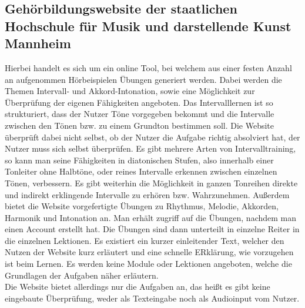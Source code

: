 \subsection*{Gehörbildungswebsite der staatlichen Hochschule für Musik und darstellende Kunst Mannheim}
\label{sec:Mannheim}
Hierbei handelt es sich um ein online Tool, bei welchem aus einer festen Anzahl an aufgenommen Hörbeispielen Übungen generiert werden.
Dabei werden die Themen Intervall- und Akkord-Intonation, sowie eine Möglichkeit zur Überprüfung der eigenen Fähigkeiten angeboten. Das Intervalllernen ist so strukturiert, dass der Nutzer Töne vorgegeben bekommt
und die Intervalle zwischen den Tönen bzw. zu einem Grundton bestimmen soll. Die Website überprüft dabei nicht selbst, ob der Nutzer die Aufgabe richtig absolviert hat, der Nutzer muss sich selbst überprüfen. 
Es gibt mehrere Arten von Intervalltraining, so kann man seine Fähigkeiten in diatonischen Stufen, also innerhalb einer Tonleiter ohne Halbtöne, oder reines Intervalle erkennen zwischen einzelnen Tönen, verbessern. Es gibt weiterhin die Möglichkeit in ganzen Tonreihen
direkte und indirekt erklingende Intervalle zu erhören bzw. Wahrzunehmen. Außerdem bietet die Website vorgefertigte Übungen zu Rhythmus, Melodie, Akkorden, Harmonik und Intonation an. Man erhält zugriff auf die Übungen, nachdem man einen Account 
erstellt hat. Die Übungen sind dann unterteilt in einzelne Reiter in die einzelnen Lektionen. Es existiert ein kurzer einleitender Text, welcher den Nutzen der Website kurz erläutert und eine schnelle ERklärung, wie vorzugehen ist beim Lernen. Es werden keine 
Module oder Lektionen angeboten, welche die Grundlagen der Aufgaben näher erläutern.\\
Die Website bietet allerdings nur die Aufgaben an, das heißt es gibt keine eingebaute Überprüfung, weder als Texteingabe noch als Audioinput vom Nutzer. \cite{hfmdk_mannheim}

